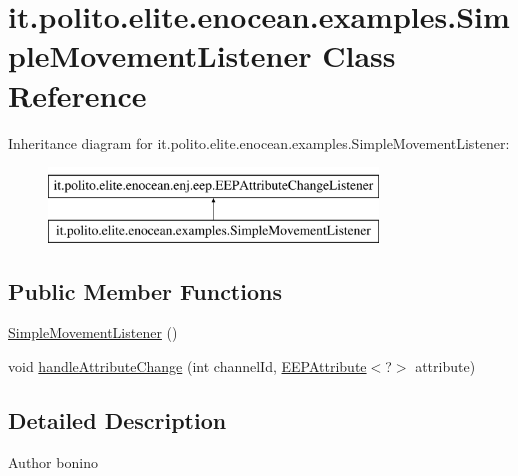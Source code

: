 \hypertarget{classit_1_1polito_1_1elite_1_1enocean_1_1examples_1_1_simple_movement_listener}{}\section{it.\+polito.\+elite.\+enocean.\+examples.\+Simple\+Movement\+Listener Class Reference}
\label{classit_1_1polito_1_1elite_1_1enocean_1_1examples_1_1_simple_movement_listener}
Inheritance diagram for it.\+polito.\+elite.\+enocean.\+examples.\+Simple\+Movement\+Listener\+:\begin{figure}[H]
\begin{center}
\leavevmode
\includegraphics[height=2.000000cm]{classit_1_1polito_1_1elite_1_1enocean_1_1examples_1_1_simple_movement_listener}
\end{center}
\end{figure}
\subsection*{Public Member Functions}
\begin{DoxyCompactItemize}
\item 
\hyperlink{classit_1_1polito_1_1elite_1_1enocean_1_1examples_1_1_simple_movement_listener_af599c6914ed856fea47351a23545e000}{Simple\+Movement\+Listener} ()
\item 
void \hyperlink{classit_1_1polito_1_1elite_1_1enocean_1_1examples_1_1_simple_movement_listener_a58979c6da36565e3ce5586b02731abc2}{handle\+Attribute\+Change} (int channel\+Id, \hyperlink{classit_1_1polito_1_1elite_1_1enocean_1_1enj_1_1eep_1_1_e_e_p_attribute}{E\+E\+P\+Attribute}$<$?$>$ attribute)
\end{DoxyCompactItemize}


\subsection{Detailed Description}
\begin{DoxyAuthor}{Author}
bonino 
\end{DoxyAuthor}


